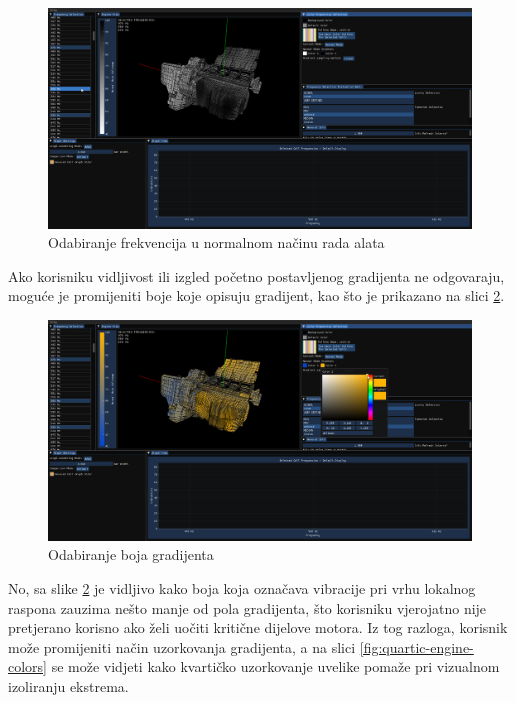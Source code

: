 \documentclass[times, utf8, diplomski]{fer}
\begin{document}
\begin{figure} [H]
	\centering
    \includegraphics[width=\textwidth]{demonstration/selected_frq.png}
    \caption{Odabiranje frekvencija u normalnom načinu rada alata}
    \label{fig:selected-frq}
\end{figure}

Ako korisniku vidljivost ili izgled početno postavljenog gradijenta ne odgovaraju, moguće je promijeniti boje koje opisuju gradijent, kao što je prikazano na slici \ref{fig:color-select}.

\begin{figure} [H]
	\centering
    \includegraphics[width=\textwidth]{demonstration/color_select.png}
    \caption{Odabiranje boja gradijenta}
    \label{fig:color-select}
\end{figure}

No, sa slike \ref{fig:color-select} je vidljivo kako boja koja označava vibracije pri vrhu lokalnog raspona zauzima nešto manje od pola gradijenta, što korisniku vjerojatno nije pretjerano korisno ako želi uočiti kritične dijelove motora. Iz tog razloga, korisnik može promijeniti način uzorkovanja gradijenta, a na slici \ref{fig:quartic-engine-colors} se može vidjeti kako kvartičko uzorkovanje uvelike pomaže pri vizualnom izoliranju ekstrema.
\end{document}
